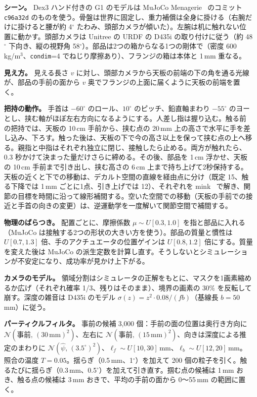 \documentclass[conference]{IEEEtran}
\begin{document}
\textbf{シーン。} Dex3 ハンド付きの G1 のモデルは MuJoCo Menagerie~\cite{menagerie2022} のコミット \texttt{c96a32d} のものを使う。骨盤は世界に固定し、重力補償は全身に掛ける（右腕だけに掛けると腰が約 4$^\circ$ たわみ、頭部カメラが傾いた）。左腕は机に触れない位置に動かす。頭部カメラは Unitree の URDF の D435i の取り付けに従う（約 48$^\circ$ 下向き、縦の視野角 58$^\circ$）。部品は2つの箱からなる1つの剛体で（密度 600\,kg/m$^3$、\texttt{condim}=4 でねじり摩擦あり）、フランジの箱は本体と 1\,mm 重なる。

\textbf{見え方。} 見える長さ $v$ に対し、頭部カメラから天板の前端の下の角を通る光線が、部品の手前の面から $v$ 奥でフランジの上面に届くように天板の前端を置く。

\textbf{把持の動作。} 手首は $-60^\circ$ のロール、$10^\circ$ のピッチ、鉛直軸まわり $-55^\circ$ のヨーとし、挟む軸がほぼ左右方向になるようにする。人差し指は握り込む。触る前の把持では、天板の 10\,cm 手前から、挟む点の 20\,mm 上の高さで水平に手を差し込み、下ろす。触った後は、天板の下で今の高さ以上を保って挟む点の上へ移る。親指と中指はそれぞれ独立に閉じ、接触したら止める。両方が触れたら、0.3 秒かけて決まった量だけさらに締める。その後、部品を 1\,cm 浮かせ、天板の 10\,cm 手前まで引き出し、挟む高さの 6\,cm 上まで持ち上げて2秒保持する。天板の近くと下での移動は、デカルト空間の直線を経由点に分け（既定 15、触る下降では 1\,mm ごとに1点、引き上げでは 12）、それぞれを mink~\cite{zakka2024mink} で解き、関節の目標を時間に沿って線形補間する。空いた空間での移動（天板の手前での接近と手首の向きの変更）は、逆運動学を一度解いて関節空間で補間する。

\textbf{物理のばらつき。} 配置ごとに、摩擦係数 $\mu\sim U[0.3,1.0]$ を指と部品に入れる（MuJoCo は接触する2つの形状の大きい方を使う）。部品の質量と慣性は $U[0.7,1.3]$ 倍、手のアクチュエータの位置ゲインは $U[0.8,1.2]$ 倍にする。質量を変えた後は MuJoCo の派生定数を計算し直す。そうしないとシミュレーションが不安定になり、成功率が見かけ上下がる。

\textbf{カメラのモデル。} 領域分割はシミュレータの正解をもとに、マスクを1画素縮めるか広げ（それぞれ確率 1/3、残りはそのまま）、境界の画素の 30\% を反転して崩す。深度の雑音は D435i のモデル $\sigma(z)=z^2\cdot0.08/(f b)$（基線長 $b=50$\,mm）に従う。

\textbf{パーティクルフィルタ。} 事前の候補 3,000 個：手前の面の位置は奥行き方向に $\mathcal{N}(\text{事前},\,(30\,\text{mm})^2)$、左右に $\mathcal{N}(\text{事前},\,(15\,\text{mm})^2)$、向きは深度による推定のまわりに $\mathcal{N}(\hat\psi,\,(3.5^\circ)^2)$、$\ell_f\sim U[10,30]$\,mm、$\ell_b\sim U[12,20]$\,mm。照合の温度 $T=0.05$。揺らぎ（0.5\,mm、1$^\circ$）を加えて 200 個の粒子を引く。触るたびに揺らぎ（0.3\,mm、0.5$^\circ$）を加えて引き直す。掴む点の候補は 1\,mm おき、触る点の候補は 3\,mm おきで、平均の手前の面から 0〜55\,mm の範囲に置く。
\end{document}
